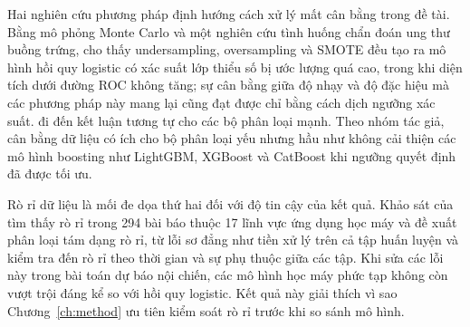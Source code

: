 \documentclass[12pt,a4paper]{report}
\begin{document}
Hai nghiên cứu phương pháp định hướng cách xử lý mất cân bằng trong đề tài. Bằng mô phỏng Monte Carlo và một nghiên cứu tình huống chẩn đoán ung thư buồng trứng, \textcite{vandengoorbergh2022} cho thấy undersampling, oversampling và SMOTE đều tạo ra mô hình hồi quy logistic có xác suất lớp thiểu số bị ước lượng quá cao, trong khi diện tích dưới đường ROC không tăng; sự cân bằng giữa độ nhạy và độ đặc hiệu mà các phương pháp này mang lại cũng đạt được chỉ bằng cách dịch ngưỡng xác suất. \textcite{elor2022smote} đi đến kết luận tương tự cho các bộ phân loại mạnh. Theo nhóm tác giả, cân bằng dữ liệu có ích cho bộ phân loại yếu nhưng hầu như không cải thiện các mô hình boosting như LightGBM, XGBoost và CatBoost khi ngưỡng quyết định đã được tối ưu.

Rò rỉ dữ liệu là mối đe dọa thứ hai đối với độ tin cậy của kết quả. Khảo sát của \textcite{kapoor2023} tìm thấy rò rỉ trong 294 bài báo thuộc 17 lĩnh vực ứng dụng học máy và đề xuất phân loại tám dạng rò rỉ, từ lỗi sơ đẳng như tiền xử lý trên cả tập huấn luyện và kiểm tra đến rò rỉ theo thời gian và sự phụ thuộc giữa các tập. Khi sửa các lỗi này trong bài toán dự báo nội chiến, các mô hình học máy phức tạp không còn vượt trội đáng kể so với hồi quy logistic. Kết quả này giải thích vì sao Chương~\ref{ch:method} ưu tiên kiểm soát rò rỉ trước khi so sánh mô hình.
\end{document}
